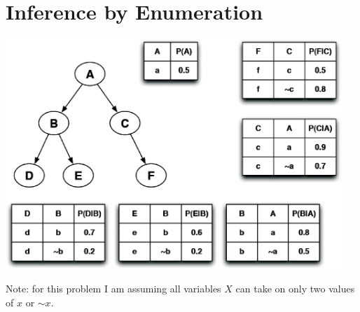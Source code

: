 \documentclass[12pt]{article}
\begin{document}
\clearpage

\section{Inference by Enumeration}

\begin{center}
\includegraphics[width=5in]{enumeration.eps}
\end{center}

Note: for this problem I am assuming all variables $X$ can take on only two values of $x$ or $\sim x$.
\end{document}
